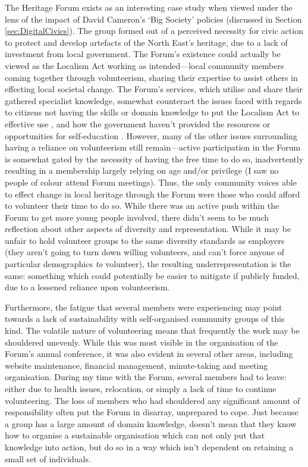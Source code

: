 The Heritage Forum exists as an interesting case study when viewed under the lens of the impact of David Cameron's `Big Society' policies (discussed in Section \ref{sec:DigitalCivics}). The group formed out of a perceived necessity for civic action to protect and develop artefacts of the North East's heritage, due to a lack of investment from local government. The Forum's existence could actually be viewed as the Localism Act working as intended---local community members coming together through volunteerism, sharing their expertise to assist others in effecting local societal change. The Forum's services, which utilise and share their gathered specialist knowledge, somewhat counteract the issues faced with regards to citizens not having the skills or domain knowledge to put the Localism Act to effective use \citep{BBCSundayPolitics2013}, and how the government haven't provided the resources or opportunities for self-education \citep{BenRogers2010a}. However, many of the other issues surrounding having a reliance on volunteerism still remain---active participation in the Forum is somewhat gated by the necessity of having the free time to do so, inadvertently resulting in a membership largely relying on age and/or privilege (I saw no people of colour attend Forum meetings). Thus, the only community voices able to effect change in local heritage through the Forum were those who could afford to volunteer their time to do so. While there was an active push within the Forum to get more young people involved, there didn't seem to be much reflection about other aspects of diversity and representation. While it may be unfair to hold volunteer groups to the same diversity standards as employers (they aren't going to turn down willing volunteers, and can't force anyone of particular demographics \textit{to} volunteer), the resulting underrepresentation is the same: something which could potentially be easier to mitigate if publicly funded, due to a lessened reliance upon volunteerism.

Furthermore, the fatigue that several members were experiencing may point towards a lack of sustainability with self-organised community groups of this kind. The volatile nature of volunteering means that frequently the work may be shouldered unevenly. While this was most visible in the organisation of the Forum's annual conference, it was also evident in several other areas, including website maintenance, financial management, minute-taking and meeting organisation. During my time with the Forum, several members had to leave: either due to health issues, relocation, or simply a lack of time to continue volunteering. The loss of members who had shouldered any significant amount of responsibility often put the Forum in disarray, unprepared to cope. Just because a group has a large amount of domain knowledge, doesn't mean that they know how to organise a sustainable organisation which can not only put that knowledge into action, but do so in a way which isn't dependent on retaining a small set of individuals.


